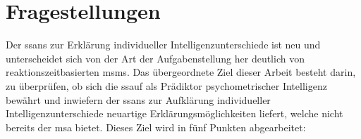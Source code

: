 \documentclass[11pt, twoside, a4paper]{book}		%
\begin{document}





\section{Fragestellungen \label{sec:Fragestellungen}}

Der \gls{ssans} zur Erklärung individueller Intelligenzunterschiede ist neu und unterscheidet sich von der Art der Aufgabenstellung her deutlich von reaktionszeitbasierten \glspl{msm}. Das übergeordnete Ziel dieser Arbeit besteht darin, zu überprüfen, ob sich die \gls{ssauf} als Prädiktor psychometrischer Intelligenz bewährt und inwiefern der \gls{ssans} zur Aufklärung individueller Intelligenzunterschiede neuartige Erklärungsmöglichkeiten liefert, welche nicht bereits der \gls{msa} bietet. Dieses Ziel wird in fünf Punkten abgearbeitet:
\end{document}
